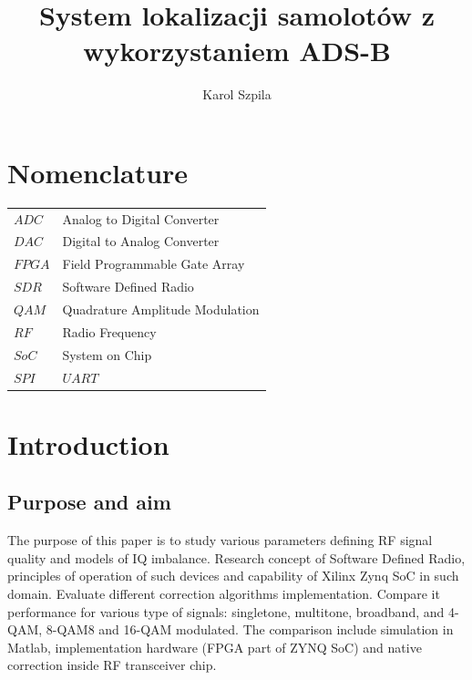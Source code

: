 \documentclass[en,printmode]{mgr}
\title{System lokalizacji samolotów z wykorzystaniem ADS-B}
\author{Karol Szpila}
\begin{document}

\maketitle %

\chapter*{Nomenclature}
\begin{table}[!htb]
\begin{tabular}{ll}
$ADC$  & Analog to Digital Converter   \\
$DAC$  & Digital to Analog Converter   \\
$FPGA$ & Field Programmable Gate Array \\
$SDR$  & Software Defined Radio \\
$QAM$  & Quadrature Amplitude Modulation \\
$RF$   & Radio Frequency \\
$SoC$  & System on Chip   \\
$SPI$  &

$UART$                        
\end{tabular}
\end{table}

\tableofcontents %

\let\cleardoublepage\clearpage %

\chapter{Introduction}
	
	\section{Purpose and aim}
			The purpose of this paper is to study various parameters defining RF signal quality and models of IQ
		imbalance. Research concept of Software Defined Radio, principles of operation of such devices and capability
		of Xilinx Zynq SoC in such domain. Evaluate different correction algorithms implementation. Compare it
		performance for various type of signals: singletone, multitone, broadband, and 4-QAM, 8-QAM8 and 16-QAM
		modulated. The comparison include simulation in Matlab, implementation hardware (FPGA part of ZYNQ SoC) and 			native correction inside RF transceiver chip.
		
\end{document}
